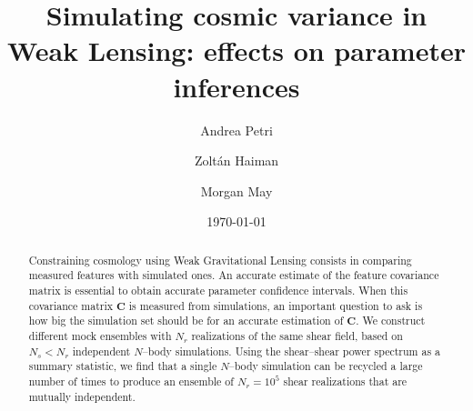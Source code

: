 \documentclass[reprint,aps,prd,superscriptaddress,showkeys,showpacs]{revtex4-1}
\newcommand{\bb}[1]{\mathbf{#1}}
\begin{document}
\title{Simulating cosmic variance in Weak Lensing: effects on parameter inferences}

\author{Andrea Petri}

\author{Zolt\'an Haiman}

\author{Morgan May}

\date{\today}

\label{firstpage}

\begin{abstract}
Constraining cosmology using Weak Gravitational Lensing consists in comparing measured features with simulated ones. An accurate estimate of the feature covariance matrix is essential to obtain accurate parameter confidence intervals. When this covariance matrix $\bb{C}$ is measured from simulations, an important question to ask is how big the simulation set should be for an accurate estimation of $\bb{C}$. We construct different mock ensembles with $N_r$ realizations of the same shear field, based on $N_s<N_r$ independent $N$--body simulations. Using the shear--shear power spectrum as a summary statistic, we find that a single $N$--body simulation can be recycled a large number of times to produce an ensemble of $N_r=10^5$ shear realizations that are mutually independent.       
\end{abstract}



\maketitle


\end{document}
